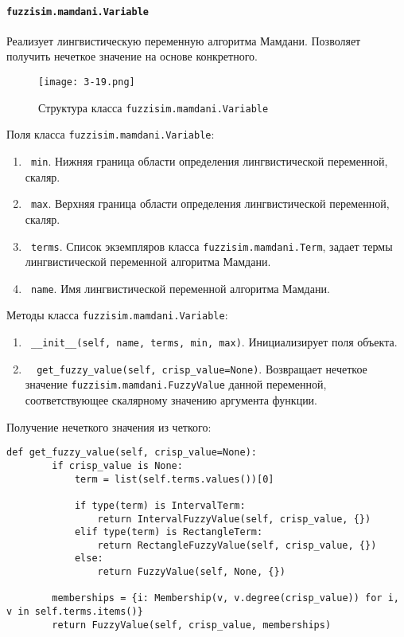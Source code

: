 \paragraph{\lstinline!fuzzisim.mamdani.Variable!}
Реализует лингвистическую переменную алгоритма Мамдани. Позволяет получить нечеткое значение на основе конкретного.

\begin{figure}[ht]
	\centering
	\texttt{[image: 3-19.png]}
	\caption{ Структура класса \lstinline!fuzzisim.mamdani.Variable!}
\end{figure}

Поля класса \lstinline!fuzzisim.mamdani.Variable!:
\begin{enumerate}[label=\arabic*)]
	\item \lstinline! min!. Нижняя граница области определения лингвистической переменной, скаляр.
	\item \lstinline! max!. Верхняя граница области определения лингвистической переменной, скаляр.
	\item \lstinline! terms!.   Список экземпляров класса  \lstinline!fuzzisim.mamdani.Term!, задает термы лингвистической переменной алгоритма Мамдани.
	\item \lstinline! name!. Имя лингвистической переменной алгоритма Мамдани.
\end{enumerate}


Методы класса \lstinline!fuzzisim.mamdani.Variable!:
\begin{enumerate}[label=\arabic*)]
	\item \lstinline! __init__(self, name, terms, min, max)!. Инициализирует поля объекта.
	\item \lstinline!  get_fuzzy_value(self, crisp_value=None)!. Возвращает нечеткое значение \lstinline!fuzzisim.mamdani.FuzzyValue! данной переменной, соответствующее скалярному значению аргумента функции.
\end{enumerate}


Получение нечеткого значения из четкого:
\begin{lstlisting}[style=pythonstyle,caption={  }, label=lst:func:1]
	def get_fuzzy_value(self, crisp_value=None):
		if crisp_value is None:
			term = list(self.terms.values())[0]
			
			if type(term) is IntervalTerm:
				return IntervalFuzzyValue(self, crisp_value, {})
			elif type(term) is RectangleTerm:
				return RectangleFuzzyValue(self, crisp_value, {})
			else:
				return FuzzyValue(self, None, {})

		memberships = {i: Membership(v, v.degree(crisp_value)) for i, v in self.terms.items()}
		return FuzzyValue(self, crisp_value, memberships)
\end{lstlisting}




